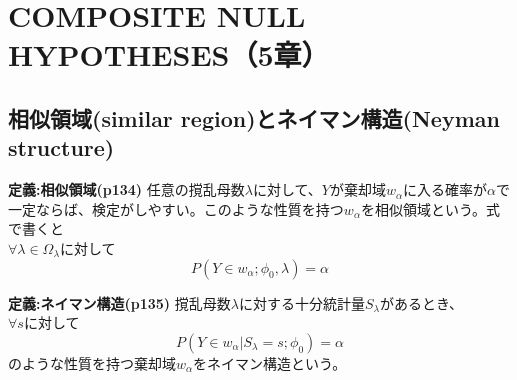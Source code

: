 \documentclass[10pt]{jarticle}
\begin{document}
\section{COMPOSITE NULL HYPOTHESES（5章）}
\subsection{相似領域(similar region)とネイマン構造(Neyman structure)}


\begin{itembox}[l]{\textbf{定義:相似領域(p134)}}
任意の撹乱母数$\lambda$に対して、$Y$が棄却域$w_\alpha$に入る確率が$\alpha$で一定ならば、検定がしやすい。このような性質を持つ$w_\alpha$を相似領域という。式で書くと\\
$\forall\lambda\in\Omega_\lambda$に対して
\[P(Y\in w_\alpha;\phi_0,\lambda)=\alpha\]
\end{itembox}


\begin{itembox}[l]{\textbf{定義:ネイマン構造(p135)}}
撹乱母数$\lambda$に対する十分統計量$S_\lambda$があるとき、\\
$\forall s$に対して
\[P(Y\in w_\alpha|S_\lambda=s;\phi_0)=\alpha\]
のような性質を持つ棄却域$w_\alpha$をネイマン構造という。
\end{itembox}
\end{document}
